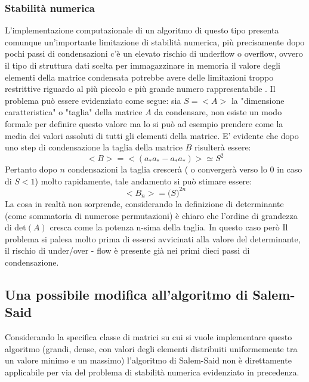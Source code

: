 \documentclass{article}
\begin{document}
\subsubsection{Stabilità numerica}
L'implementazione computazionale di un algoritmo di questo tipo presenta comunque un'importante limitazione di stabilità numerica, più precisamente dopo pochi passi di condensazioni c'è un elevato rischio di underflow o overflow, ovvero il tipo di struttura dati scelta per immagazzinare in memoria il valore degli elementi della matrice condensata potrebbe avere delle limitazioni troppo restrittive riguardo al più piccolo e più grande numero rappresentabile .
Il problema può essere evidenziato come segue:
sia $S = <A>$ la "dimensione caratteristica" o "taglia" della matrice $A$ da condensare, non esiste un modo formale per definire questo valore ma lo si può ad esempio prendere come la media dei valori assoluti di tutti gli elementi della matrice.
E' evidente che dopo uno step di condensazione la taglia della matrice $B$ risulterà essere:
\begin{equation}
<B> = <(a_{\ast}a_{\ast} -a_{\ast}a_{\ast})>  \simeq S^{2}
\end{equation}
Pertanto dopo $n$ condensazioni la taglia crescerà ( o convergerà verso lo 0 in caso di $S<1$) molto rapidamente, tale andamento si può stimare essere:
\begin{equation}
<B_{n}> = \big( S \big) ^{2n}
\end{equation}
La cosa in realtà non sorprende, considerando la definizione di determinante (come sommatoria di numerose permutazioni) è chiaro che l'ordine di grandezza di det$(A)$ cresca come la potenza n-sima della taglia. In questo caso però Il problema si palesa molto prima di essersi avvicinati alla valore del determinante, il rischio di  under/over - flow  è presente già nei primi dieci passi di condensazione.

\subsection{Una possibile modifica all'algoritmo di Salem-Said}
Considerando la specifica classe di matrici su cui si vuole implementare questo algoritmo (grandi, dense, con valori degli elementi distribuiti uniformemente tra un valore minimo e un massimo) l'algoritmo di Salem-Said non è direttamente applicabile per via del problema di stabilità numerica evidenziato in precedenza.
\end{document}
